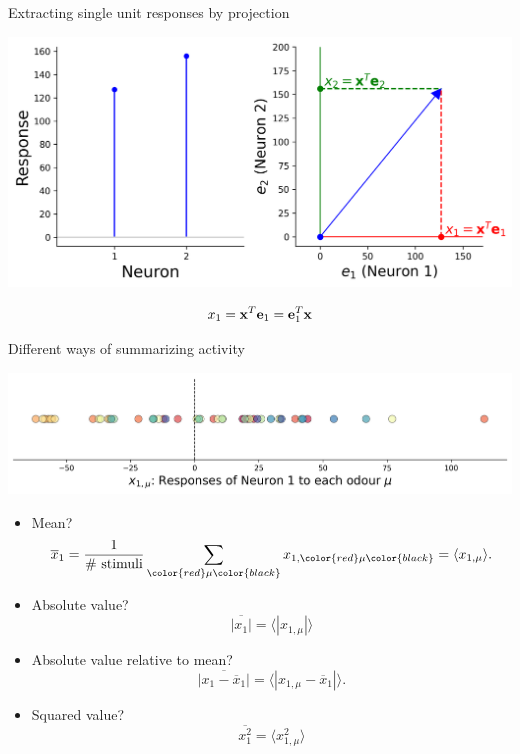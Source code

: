 \documentclass[presentation,smaller]{beamer}
\begin{document}
\begin{frame}[label={sec:org4e72935}]{Extracting single unit responses by projection}
\begin{center}
\includegraphics[width=1.0\textwidth]{figures/projections.png}
\end{center}
  $$ x_1 = \mathbf{x}^T \mathbf e_1 = \mathbf e_1^T \mathbf{x} $$
\end{frame}
\begin{frame}[label={sec:orgd8ef92d}]{Different ways of summarizing activity}
\begin{center}
\includegraphics[width=1.0\textwidth]{figures/neuron0.png}
\end{center}  
\begin{itemize}
\item Mean?
$$ \overline{x}_1 = {1 \over \text{\# stimuli}} \sum_{\color{red}\mu\color{black}} x_{1,\color{red}\mu\color{black}} = \langle x_{1,\mu} \rangle.$$
\item Absolute value? $$\overline{|x_1|} = \langle |x_{1,\mu}| \rangle$$
\item Absolute value relative to mean?
$$ \overline{|x_1 - \overline{x}_1|} = \langle |x_{1,\mu} - \overline{x}_1 | \rangle.$$
\item Squared value?
$$ \overline{x^2_1} = \langle x^2_{1,\mu} \rangle$$
\end{itemize}
\end{frame}
\end{document}
